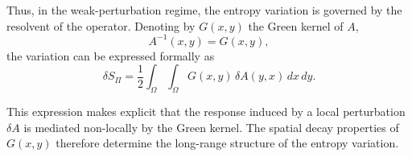     Thus, in the weak-perturbation regime, the entropy variation is governed
    by the resolvent of the operator.
    Denoting by $G(x,y)$ the Green kernel of $A$,
    \begin{equation}
      A^{-1}(x,y) = G(x,y),
    \end{equation}
    the variation can be expressed formally as
    \begin{equation}
      \delta S_\Pi
      = \frac12 \int_\Omega \int_\Omega
      G(x,y)\, \delta A(y,x)\, dx\, dy.
    \end{equation}

    This expression makes explicit that the response induced by a local
    perturbation $\delta A$ is mediated non-locally by the Green kernel.
    The spatial decay properties of $G(x,y)$ therefore determine the
    long-range structure of the entropy variation.
